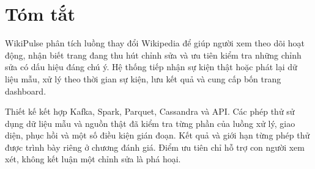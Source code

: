 \chapter*{Tóm tắt}
WikiPulse phân tích luồng thay đổi Wikipedia để giúp người xem theo dõi hoạt động, nhận biết trang đang thu hút chỉnh sửa và ưu tiên kiểm tra những chỉnh sửa có dấu hiệu đáng chú ý. Hệ thống tiếp nhận sự kiện thật hoặc phát lại dữ liệu mẫu, xử lý theo thời gian sự kiện, lưu kết quả và cung cấp bốn trang dashboard.

Thiết kế kết hợp Kafka, Spark, Parquet, Cassandra và API. Các phép thử sử dụng dữ liệu mẫu và nguồn thật đã kiểm tra từng phần của luồng xử lý, giao diện, phục hồi và một số điều kiện gián đoạn. Kết quả và giới hạn từng phép thử được trình bày riêng ở chương đánh giá. Điểm ưu tiên chỉ hỗ trợ con người xem xét, không kết luận một chỉnh sửa là phá hoại.
